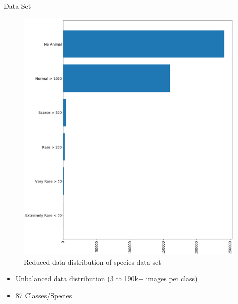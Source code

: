 \documentclass[10pt]{beamer}
\begin{document}
\begin{frame}{Data Set}
	\begin{minipage}[c]{0.48\linewidth}
		\centering
		\begin{figure}
			\includegraphics[width=\linewidth,height=.8\textheight,keepaspectratio]{images/Data_dist_sorted_reduced_v2.png}
			\caption{Reduced data distribution of species data set}
		\end{figure}
	\end{minipage}
	\hfill
	\begin{minipage}[c]{0.48\linewidth}
	\begin{itemize}
		\item Unbalanced data distribution (3 to 190k+ images per class)
		\item 87 Classes/Species
	\end{itemize}

	\end{minipage}
\end{frame}

\end{document}
